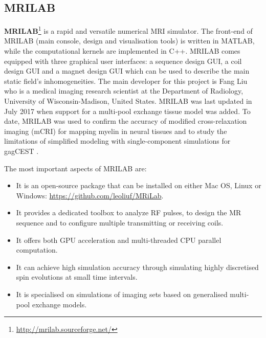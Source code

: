 \subsection{MRILAB}
\textbf{MRILAB}\footnote{\url{http://mrilab.sourceforge.net/}} is a rapid and versatile numerical MRI simulator. 
The front-end of MRILAB (main console, design and visualisation tools) is written in MATLAB, while the computational kernels are implemented in C++.
MRILAB comes equipped with three graphical user interfaces: a sequence design GUI, a coil design GUI and a magnet design GUI which can be used to describe the main static field's inhomogeneities.
The main developer for this project is Fang Liu who is a medical imaging research scientist at the Department of Radiology, University of Wisconsin-Madison, United States.
MRILAB was last updated in July 2017 when support for a multi-pool exchange tissue model was added.
To date, MRILAB was used to confirm the accuracy of modified cross-relaxation imaging (mCRI) for mapping myelin in neural tissues and to study the limitations of simplified modeling with single-component simulations for gagCEST \cite{Liu2017}.

\hfill

The most important aspects of MRILAB are:
\begin{itemize}

    \item It is an open-source package that can be installed on either Mac OS, Linux or Windows: \url{https://github.com/leoliuf/MRiLab}.
    
    \item It provides a dedicated toolbox to analyze RF pulses, to design the MR sequence and to configure multiple transmitting or receiving coils.
    
    \item It offers both GPU acceleration and multi-threaded CPU parallel computation.
    
    \item It can achieve high simulation accuracy through simulating highly discretised spin evolutions at small time intervals.
    
    \item It is specialised on simulations of imaging sets based on generalised multi-pool exchange models.
    
\end{itemize}

\hfill

